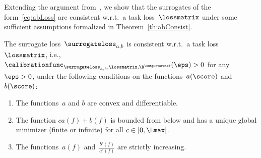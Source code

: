 \documentclass{article}
\begin{document}
Extending the argument from~\citet{zhang04}, we show that the surrogates of the form~\eqref{eq:abLoss} are consistent w.r.t.\ a task loss~$\lossmatrix$ under some sufficient assumptions formalized in Theorem~\ref{th:abConsist}.
\begin{theorem}
    \label{th:abConsist}
    The surrogate loss~$\surrogateloss_{a,b}$ is consistent w.r.t.\ a task loss~$\lossmatrix$, i.e., $\calibrationfunc_{\surrogateloss_{a,b},\lossmatrix,\R^\outputvarcard}(\eps) > 0$ for any $\eps > 0$, under the following conditions on the functions~$a(\score)$ and $b(\score)$:
    \begin{enumerate}[noitemsep,topsep=-2mm]
        \item\label{item:thCond:smooth} The functions~$a$ and $b$ are convex and differentiable.
        \item\label{item:thCond:bounded} The function $ca(f) + b(f)$ is bounded from below and has a unique global minimizer (finite or infinite) for all $c \in [0, \Lmax]$.
        \item\label{item:thCond:second}  The functions~$a(f)$ and~$\frac{b'(f)}{a'(f)}$ are strictly increasing.
    \end{enumerate}
\end{theorem}
\end{document}
